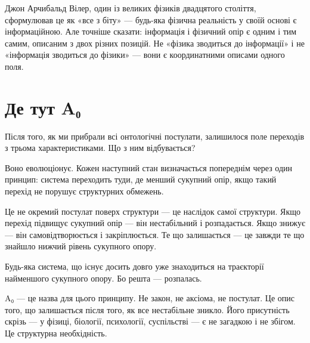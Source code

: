 \documentclass[12pt, a4paper, openany]{book}
\begin{document}
Джон Арчибальд Вілер, один із великих фізиків двадцятого століття, сформулював це як «все з біту» --- будь-яка фізична реальність у своїй основі є інформаційною. Але точніше сказати: інформація і фізичний опір є одним і тим самим, описаним з двох різних позицій. Не «фізика зводиться до інформації» і не «інформація зводиться до фізики» --- вони є координатними описами одного поля.

\section{Де тут A₀}

Після того, як ми прибрали всі онтологічні постулати, залишилося поле переходів з трьома характеристиками. Що з ним відбувається?

Воно еволюціонує. Кожен наступний стан визначається попереднім через один принцип: система переходить туди, де менший сукупний опір, якщо такий перехід не порушує структурних обмежень.

Це не окремий постулат поверх структури --- це наслідок самої структури. Якщо перехід підвищує сукупний опір --- він нестабільний і розпадається. Якщо знижує --- він самовідтворюється і закріплюється. Те що залишається --- це завжди те що знайшло нижчий рівень сукупного опору.

Будь-яка система, що існує досить довго уже знаходиться на траєкторії найменшого сукупного опору. Бо решта --- розпалась.

A₀ --- це назва для цього принципу. Не закон, не аксіома, не постулат. Це опис того, що залишається після того, як все нестабільне зникло. Його присутність скрізь --- у фізиці, біології, психології, суспільстві --- є не загадкою і не збігом. Це структурна необхідність.
\end{document}
